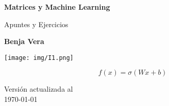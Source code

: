 \begin{titlepage}
    \begin{center}
        \vspace*{1cm}
            
        \Huge
        \textbf{Matrices y Machine Learning}
            
        \vspace{0.5cm}
        \LARGE
        Apuntes y Ejercicios
            
        \vspace{2em}
            
        \textbf{Benja Vera}

        \vspace{2em}

        \texttt{[image: img/I1.png]}
            
        \vfill
        
        \Huge
        \[f(x) = \sigma(Wx + b)\]

        \vfill
            
        \Large
        Versión actualizada al\\
        \today
        
        \vspace{3cm}
    \end{center}
\end{titlepage}
